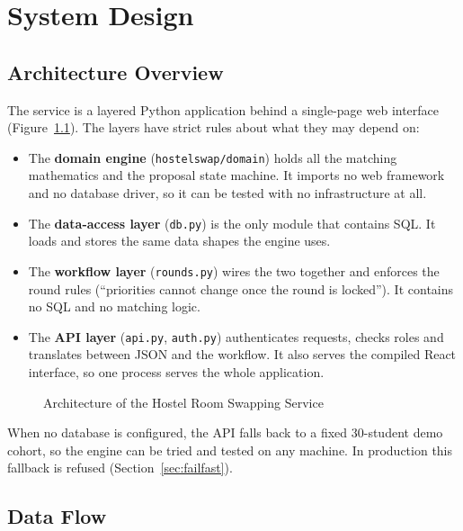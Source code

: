
\chapter{System Design}
\label{ch:design}

\section{Architecture Overview}

The service is a layered Python application behind a single-page web
interface (Figure~\ref{fig:arch}). The layers have strict rules about
what they may depend on:

\begin{itemize}
  \item The \textbf{domain engine} (\texttt{hostelswap/domain}) holds all
  the matching mathematics and the proposal state machine. It imports no
  web framework and no database driver, so it can be tested with no
  infrastructure at all.
  \item The \textbf{data-access layer} (\texttt{db.py}) is the only
  module that contains SQL. It loads and stores the same data shapes the
  engine uses.
  \item The \textbf{workflow layer} (\texttt{rounds.py}) wires the two
  together and enforces the round rules (``priorities cannot change once
  the round is locked''). It contains no SQL and no matching logic.
  \item The \textbf{API layer} (\texttt{api.py}, \texttt{auth.py})
  authenticates requests, checks roles and translates between JSON and
  the workflow. It also serves the compiled React interface, so one
  process serves the whole application.
\end{itemize}

\begin{figure}[H]
\centering
\resizebox{\textwidth}{!}{}
\caption{Architecture of the Hostel Room Swapping Service}
\label{fig:arch}
\end{figure}

When no database is configured, the API falls back to a fixed 30-student
demo cohort, so the engine can be tried and tested on any machine. In
production this fallback is refused (Section~\ref{sec:failfast}).

\section{Data Flow}

